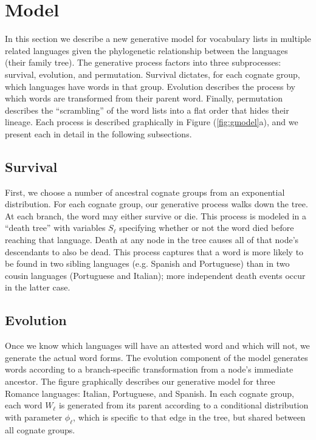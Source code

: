 \documentclass[11pt,a4paper]{article}
\begin{document}
\section{Model}

In this section we describe a new generative model for vocabulary lists
in multiple related languages given the phylogenetic relationship
between the languages (their family tree). The generative
process factors into three subprocesses: survival, evolution, and
permutation. Survival dictates, for each cognate group, which
languages have words in that group. Evolution describes the process
by which words are transformed from their parent word. Finally,
permutation describes the ``scrambling'' of the word lists into a flat
order that hides their lineage. Each process is
described graphically in Figure (\ref{fig:gmodel}a), and we present
each in detail in the following subsections.

\subsection{Survival}

First, we choose a number of ancestral cognate groups from an
exponential distribution.  For each cognate group, our generative
process walks down the tree.  At each branch, the word may either
survive or die.  This process is modeled in a ``death tree'' with
variables $S_\ell$ specifying whether or not the word died before
reaching that language. Death at any node in the tree causes all
of that node's descendants to also be dead.  This process captures
that a word is more likely to be found in two sibling languages
(e.g. Spanish and Portuguese) than in two cousin languages
(Portuguese and Italian); more independent death events occur in the latter case. 


\subsection{Evolution}

Once we know which languages will have an attested word and which
will not, we generate the actual word forms. The evolution component of
the model generates words according to a branch-specific transformation from a node's 
immediate ancestor.  The figure graphically describes our generative
model for three Romance languages: Italian, Portuguese, and Spanish.
In each cognate group, each word $W_\ell$ is generated from its
parent according to a conditional distribution with parameter $\phi_\ell$,
which is specific to that edge in the tree, but shared between all
cognate groups.
\end{document}
